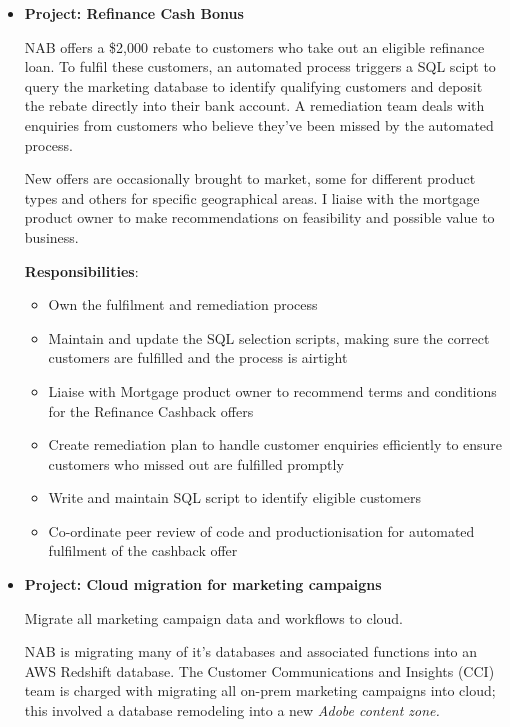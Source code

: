 \documentclass{article}
\begin{document}
\begin{itemize}
    \item \textbf{Project: Refinance Cash Bonus}

NAB offers a \$2,000 rebate to customers who take out an eligible refinance loan.
To fulfil these customers, an automated process triggers a SQL scipt to query the marketing database to identify qualifying customers and deposit the rebate directly into their bank account. A remediation team deals with enquiries from customers who believe they've been missed by the automated process.

New offers are occasionally brought to market, some for different product types and others for specific geographical areas. I liaise with the mortgage product owner to make recommendations on feasibility and possible value to business.

\textbf{Responsibilities}:

        \begin{itemize}
            \item Own the fulfilment and remediation process
            \item Maintain and update the SQL selection scripts, making sure the correct customers are fulfilled and the process is airtight
            \item Liaise with Mortgage product owner to recommend terms and conditions for the Refinance Cashback offers
            \item Create remediation plan to handle customer enquiries efficiently to ensure customers who missed out are fulfilled promptly
            \item Write and maintain SQL script to identify eligible customers
            \item Co-ordinate peer review of code and productionisation for automated fulfilment of the cashback offer
        \end{itemize}

    \item \textbf{Project: Cloud migration for marketing campaigns}

        Migrate all marketing campaign data and workflows to cloud.

        NAB is migrating many of it's databases and associated functions into an AWS Redshift database. The Customer Communications and Insights (CCI) team is charged with migrating all on-prem marketing campaigns into cloud; this involved a database remodeling into a new \textit{Adobe content zone.}


\end{itemize}
\end{document}
